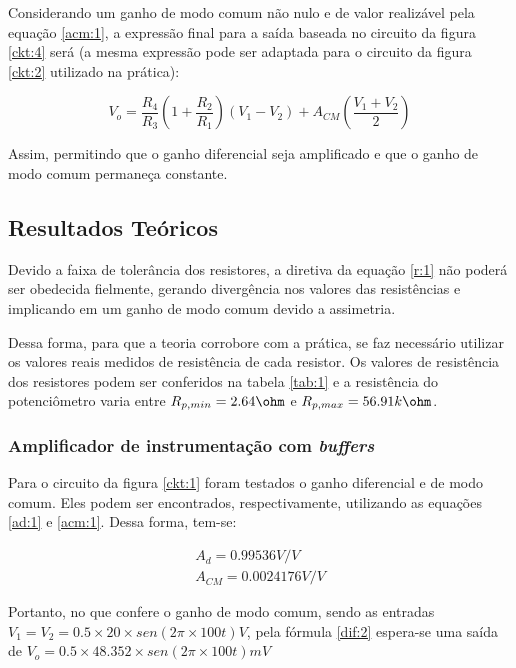Considerando um ganho de modo comum não nulo e de valor realizável pela equação \ref{acm:1}, a expressão final para a saída baseada no circuito da figura \ref{ckt:4} será (a mesma expressão pode ser adaptada para o circuito da figura \ref{ckt:2} utilizado na prática):

\begin{center}
\begin{equation} \label{vo:1}
        V_o = \frac{R_4}{R_3}\left( 1+\frac{R_2}{R_1}\right)(V_1-V_2)+A_{CM}\left(\frac{V_1+V_2}{2}\right)
\end{equation}
\end{center}

Assim, permitindo que o ganho diferencial seja amplificado e que o ganho de modo comum permaneça constante.

\subsection{Resultados Teóricos}

Devido a faixa de tolerância dos resistores, a diretiva da equação \ref{r:1} não poderá ser obedecida fielmente, gerando divergência nos valores das resistências e implicando em um ganho de modo comum devido a assimetria.

Dessa forma, para que a teoria corrobore com a prática, se faz necessário utilizar os valores reais medidos de resistência de cada resistor. Os valores de resistência dos resistores podem ser conferidos na tabela \ref{tab:1} e a resistência do potenciômetro varia entre $R_{p,min} = 2.64 \ohm$ e $R_{p,max} = 56.91k \ohm$. 

\subsubsection{Amplificador de instrumentação com \textit{buffers}}

Para o circuito da figura \ref{ckt:1} foram testados o ganho diferencial e de modo comum. Eles podem ser encontrados, respectivamente, utilizando as equações \ref{ad:1} e \ref{acm:1}. Dessa forma, tem-se:


\begin{equation} \label{adacm:1}
\begin{aligned}
        A_d = 0.99536 V/V \\ 
        A_{CM} = 0.0024176 V/V
\end{aligned}
\end{equation}

Portanto, no que confere o ganho de modo comum, sendo as entradas $V_1=V_2=0.5 \times 20 \times sen(2 \pi \times 100t) V$, pela fórmula \ref{dif:2} espera-se uma saída de $V_o = 0.5 \times 48.352 \times sen(2 \pi \times 100t) mV$

